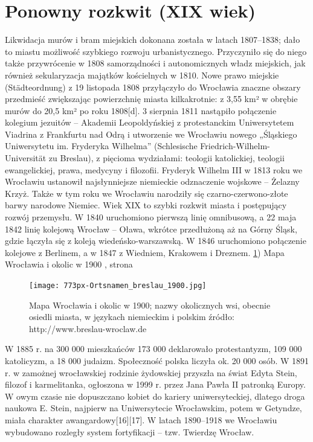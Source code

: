 \documentclass{article}
\begin{document}
\section{Ponowny rozkwit (XIX wiek)}
\vspace{3mm} %
\newline Likwidacja murów i bram miejskich dokonana została w latach 1807–1838; dało to miastu możliwość szybkiego rozwoju urbanistycznego. Przyczyniło się do niego także przywrócenie w 1808 samorządności i autonomicznych władz miejskich, jak również sekularyzacja majątków kościelnych w 1810. Nowe prawo miejskie (Städteordnung) z 19 listopada 1808 przyłączyło do Wrocławia znaczne obszary przedmieść zwiększając powierzchnię miasta kilkakrotnie: z 3,55 km² w obrębie murów do 20,5 km² po roku 1808[d]. 3 sierpnia 1811 nastąpiło połączenie kolegium jezuitów – Akademii Leopoldyńskiej z protestanckim Uniwersytetem Viadrina z Frankfurtu nad Odrą i utworzenie we Wrocławiu nowego „Śląskiego Uniwersytetu im. Fryderyka Wilhelma” (Schlesische Friedrich-Wilhelm-Universität zu Breslau), z pięcioma wydziałami: teologii katolickiej, teologii ewangelickiej, prawa, medycyny i filozofii. Fryderyk Wilhelm III w 1813 roku we Wrocławiu ustanowił najsłynniejsze niemieckie odznaczenie wojskowe – Żelazny Krzyż. Także w tym roku we Wrocławiu narodziły się czarno-czerwono-złote barwy narodowe Niemiec. Wiek XIX to szybki rozkwit miasta i postępujący rozwój przemysłu. W 1840 uruchomiono pierwszą linię omnibusową, a 22 maja 1842 linię kolejową Wrocław – Oława, wkrótce przedłużoną aż na Górny Śląsk, gdzie łączyła się z koleją wiedeńsko-warszawską. W 1846 uruchomiono połączenie kolejowe z Berlinem, a w 1847 z Wiedniem, Krakowem i Dreznem.
\newline\ref{fig:mapawrociok}) Mapa Wrocławia i okolic w 1900 , strona \pageref{fig:mapawrociok}
\begin{figure}[h!]
\centering
\texttt{[image: 773px-Ortsnamen\_breslau\_1900.jpg]}
\caption{Mapa Wrocławia i okolic w 1900;
nazwy okolicznych wsi, obecnie osiedli miasta, w językach niemieckim i polskim
źródło: http://www.breslau-wroclaw.de}
\label{fig:mapawrociok}
\end{figure}
\vspace{3mm} %
\newline W 1885 r. na 300 000 mieszkańców 173 000 deklarowało protestantyzm, 109 000 katolicyzm, a 18 000 judaizm. Społeczność polska liczyła ok. 20 000 osób.
\vspace{3mm} %
\newline W 1891 r. w zamożnej wrocławskiej rodzinie żydowskiej przyszła na świat Edyta Stein, filozof i karmelitanka, ogłoszona w 1999 r. przez Jana Pawła II patronką Europy. W owym czasie nie dopuszczano kobiet do kariery uniwersyteckiej, dlatego droga naukowa E. Stein, najpierw na Uniwersytecie Wrocławskim, potem w Getyndze, miała charakter awangardowy[16][17].
\vspace{3mm} %
\newline W latach 1890–1918 we Wrocławiu wybudowano rozległy system fortyfikacji – tzw. Twierdzę Wrocław.
\end{document}
